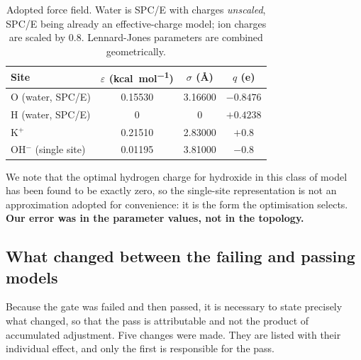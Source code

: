 \documentclass[11pt,a4paper]{article}
\begin{document}
\begin{table}[htbp]\centering\small
\caption{Adopted force field. Water is SPC/E with charges \emph{unscaled}, SPC/E being already an
effective-charge model; ion charges are scaled by 0.8. Lennard-Jones parameters are combined
geometrically.}
\label{tab:ff}
\begin{tabular}{@{}lccc@{}}
\toprule
Site & $\varepsilon$ (\si{kcal\per\mole}) & $\sigma$ (\si{\angstrom}) & $q$ (e) \\
\midrule
O (water, SPC/E) & 0.15530 & 3.16600 & $-0.8476$ \\
H (water, SPC/E) & 0 & 0 & $+0.4238$ \\
K$^+$            & 0.21510 & 2.83000 & $+0.8$ \\
OH$^-$ (single site) & 0.01195 & 3.81000 & $-0.8$ \\
\bottomrule
\end{tabular}
\end{table}

We note that the optimal hydrogen charge for hydroxide in this class of model has been found to be
exactly zero, so the single-site representation is not an approximation adopted for convenience: it
is the form the optimisation selects. \textbf{Our error was in the parameter values, not in the
topology.}

\subsection{What changed between the failing and passing models}\label{sec:whatchanged}

Because the gate was failed and then passed, it is necessary to state precisely what changed, so
that the pass is attributable and not the product of accumulated adjustment. Five changes were made.
They are listed with their individual effect, and only the first is responsible for the pass.
\end{document}
